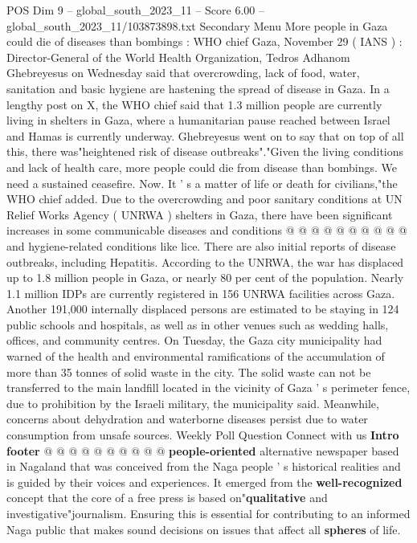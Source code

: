 \begin{textsample}{POS Dim 9 – global\_south\_2023\_11 – Score 6.00 – global\_south\_2023\_11/103873898.txt}  \label{ex:f9_pos_028}
Secondary Menu More people in Gaza could die of diseases than bombings : WHO chief Gaza, November 29 ( IANS ) : Director-General of the World Health Organization, Tedros Adhanom Ghebreyesus on Wednesday said that overcrowding, lack of food, water, sanitation and basic hygiene are hastening the spread of disease in Gaza.
In a lengthy post on X, the WHO chief said that 1.3 million people are currently living in shelters in Gaza, where a humanitarian pause reached between Israel and Hamas is currently underway.
Ghebreyesus went on to say that on top of all this, there was"heightened risk of disease outbreaks"."Given the living conditions and lack of health care, more people could die from disease than bombings.
We need a sustained ceasefire.
Now.
It ' s a matter of life or death for civilians,"the WHO chief added.
Due to the overcrowding and poor sanitary conditions at UN Relief Works Agency ( UNRWA ) shelters in Gaza, there have been significant increases in some communicable diseases and conditions @ @ @ @ @ @ @ @ @ @ and hygiene-related conditions like lice.
There are also initial reports of disease outbreaks, including Hepatitis.
According to the UNRWA, the war has displaced up to 1.8 million people in Gaza, or nearly 80 per cent of the population.
Nearly 1.1 million IDPs are currently registered in 156 UNRWA facilities across Gaza.
Another 191,000 internally displaced persons are estimated to be staying in 124 public schools and hospitals, as well as in other venues such as wedding halls, offices, and community centres.
On Tuesday, the Gaza city municipality had warned of the health and environmental ramifications of the accumulation of more than 35 tonnes of solid waste in the city.
The solid waste can not be transferred to the main landfill located in the vicinity of Gaza ' s perimeter fence, due to prohibition by the Israeli military, the municipality said.
Meanwhile, concerns about dehydration and waterborne diseases persist due to water consumption from unsafe sources.
Weekly Poll Question Connect with us \textbf{Intro} \textbf{footer} @ @ @ @ @ @ @ @ @ @ \textbf{people-oriented} alternative newspaper based in Nagaland that was conceived from the Naga people ' s historical realities and is guided by their voices and experiences.
It emerged from the \textbf{well-recognized} concept that the core of a free press is based on"\textbf{qualitative} and investigative"journalism.
Ensuring this is essential for contributing to an informed Naga public that makes sound decisions on issues that affect all \textbf{spheres} of life.

\end{textsample}
